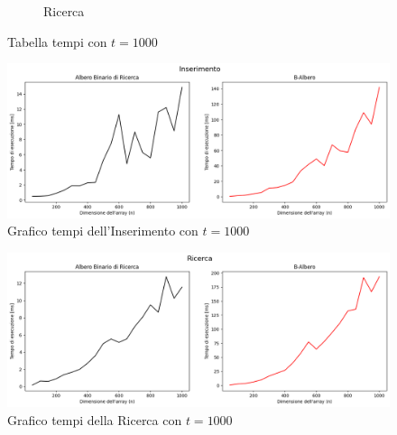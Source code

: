 \begin{figure}[H]
\begin{subfigure}[b]{0.49\textwidth}
        \caption{Ricerca}
        \label{fig:tablesearchtimet1000}
    \end{subfigure}
    \caption{Tabella tempi con $t=1000$}
    \label{fig:tabletimest1000}
\end{figure}

\begin{figure}[H]
    \centering
    \includegraphics[width=\textwidth]{side-graphs/insert-ms-t1000.png}
    \caption{Grafico tempi dell'Inserimento con $t=1000$}
    \label{fig:sidegraphinserttimet1000}
\end{figure}
    
\begin{figure}[H]
    \centering
    \includegraphics[width=\textwidth]{side-graphs/search-ms-t1000.png}
    \caption{Grafico tempi della Ricerca con $t=1000$}    
    \label{fig:sidegraphsearchtimet1000}
\end{figure}

